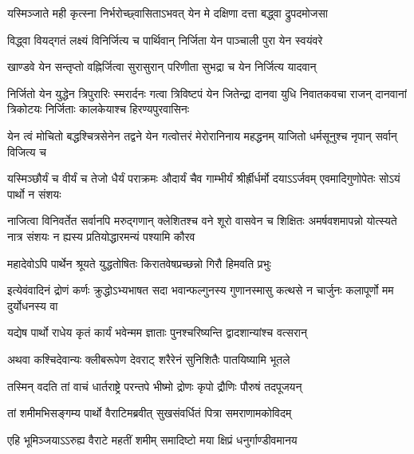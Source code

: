 \twolineshloka
{यस्मिञ्जाते मही कृत्स्ना निर्भरोच्छ्वासिताऽभवत्}
{येन मे दक्षिणा दत्ता बद्ध्वा द्रुपदमोजसा}


\twolineshloka
{विद्ध्वा वियद्गतं लक्ष्यं विनिर्जित्य च पार्थिवान्}
{निर्जिता येन पाञ्चाली पुरा येन स्वयंवरे}


\twolineshloka
{खाण्डवे येन सन्तृप्तो वह्निर्जित्वा सुरासुरान्}
{परिणीता सुभद्रा च येन निर्जित्य यादवान्}


\onelineshloka
{निर्जितो येन युद्धेन त्रिपुरारिः स्मरार्दनः}
\threelineshloka
{गत्वा त्रिविष्टपं येन जितेन्द्रा दानवा युधि}
{निवातकवचा राजन् दानवानां त्रिकोटयः}
{निर्जिताः कालकेयाश्च हिरण्यपुरवासिनः}


\onelineshloka
{येन त्वं मोचितो बद्धश्चित्रसेनेन तद्वने}
\twolineshloka
{येन गत्वोत्तरं मेरोरानिनाय महद्धनम्}
{याजितो धर्मसूनुश्च नृपान् सर्वान् विजित्य च}


\threelineshloka
{यस्मिञ्छौर्यं च वीर्यं च तेजो धैर्यं पराक्रमः}
{औदार्यं चैव गाम्भीर्यं श्रीर्ह्रीर्धर्मो दयाऽऽर्जवम्}
{एवमादिगुणोपेतः सोऽयं पार्थो न संशयः}


\onelineshloka
{नाजित्वा विनिवर्तेत सर्वानपि मरुद्गणान्}
\threelineshloka
{क्लेशितश्च वने शूरो वासवेन च शिक्षितः}
{अमर्षवशमापन्नो योत्स्यते नात्र संशयः}
{न ह्यस्य प्रतियोद्धारमन्यं पश्यामि कौरव}


\twolineshloka
{महादेवोऽपि पार्थेन श्रूयते युद्धतोषितः}
{किरातवेषप्रच्छन्नो गिरौ हिमवति प्रभुः}


\onelineshloka
{इत्येवंवादिनं द्रोणं कर्णः क्रुद्धोऽभ्यभाषत}
\twolineshloka
{सदा भवान्फल्गुनस्य गुणानस्मासु कत्थसे}
{न चार्जुनः कलापूर्णो मम दुर्योधनस्य वा}




\twolineshloka
{यद्येष पार्थो राधेय कृतं कार्यं भवेन्मम}
{ज्ञाताः पुनश्चरिष्यन्ति द्वादशान्यांश्च वत्सरान्}


\twolineshloka
{अथवा कश्चिदेवान्यः क्लीबरूपेण देवराट्}
{शरैरेनं सुनिशितैः पातयिष्यामि भूतले}



\twolineshloka
{तस्मिन् वदति तां वाचं धार्तराष्ट्रे परन्तपे}
{भीष्मो द्रोणः कृपो द्रौणिः पौरुषं तदपूजयन्}


\twolineshloka
{तां शमीमभिसङ्गम्य पार्थो वैराटिमब्रवीत्}
{सुखसंवर्धितं पित्रा समराणामकोविदम्}


\twolineshloka
{एहि भूमिञ्जयाऽऽरुह्य वैराटे महतीं शमीम्}
{समादिष्टो मया क्षिप्रं धनुर्गाण्डीवमानय}


